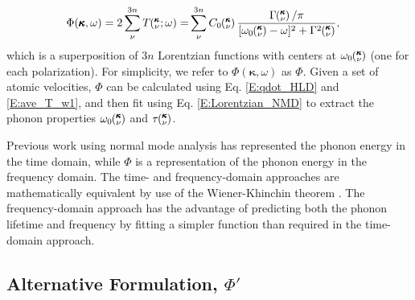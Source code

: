 \documentclass[12pt,twocolumn,iop]{/usr/share/texmf-texlive/tex/latex/iop/iopart}[/usr/share/texmf-texlive/tex/latex/iop/]
\newcommand{\kvw}{\mspace{-4.0mu}\left(\mspace{-8.0mu}\begin{smallmatrix}&\pmb{\kappa} \\&\nu\end{smallmatrix}\mspace{-2.0mu};\omega\right)}
\newcommand{\kv}{\mspace{-4.0mu}\left(\mspace{-8.0mu}\begin{smallmatrix}&\pmb{\kappa} \\&\nu\end{smallmatrix}\mspace{-3.0mu}\right)}
\begin{document}
\begin{equation}\label{E:Lorentzian_NMD}
\begin{split}
\Phi(\pmb{\kappa},\omega) = 2\sum_{\nu}^{3n} T\kvw =& \sum_{\nu}^{3n}C_0\kv\frac{\Gamma\kv/\pi}{[\omega_0\kv-\omega]^2+\Gamma^2\kv},
\end{split}
\end{equation}
which is a superposition of $3n$ Lorentzian functions with centers at $\omega_0\kv$ (one for each polarization). For simplicity, we refer to $\Phi(\pmb{\kappa},\omega)$ as $\Phi$. Given a set of atomic velocities, $\Phi$ can be calculated using Eq$.$ \eqref{E:qdot_HLD} and \eqref{E:ave_T_w1}, and then fit using Eq$.$ \eqref{E:Lorentzian_NMD} to extract the phonon properties $\omega_0\kv$ and $\tau\kv$.

Previous work using normal mode analysis has represented the phonon energy in the time domain,\cite{ladd1986,mcgaughey2004c,henry2008,turney2009a,goicochea2010,He2011} while $\Phi$ is a representation of the phonon energy in the frequency domain. The time- and frequency-domain approaches are mathematically equivalent by use of the Wiener-Khinchin theorem \cite{rudin1987,shiomi2011b}. The frequency-domain approach has the advantage of predicting both the phonon lifetime and frequency by fitting a simpler function than required in the time-domain approach.

\subsection{\label{S:Subsection_Proposed_SED}Alternative Formulation, $\Phi'$}
\end{document}
